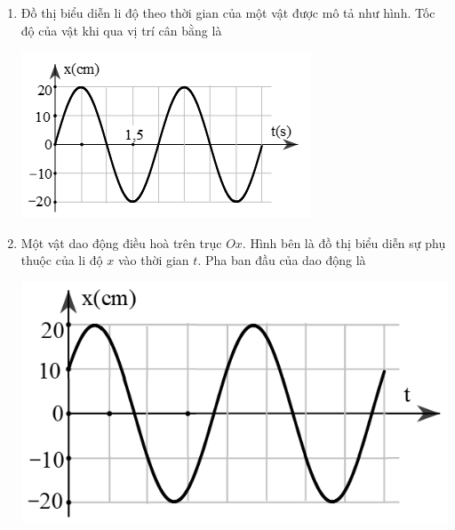 \begin{enumerate}[label=\bfseries Câu \arabic*:]
\item Đồ thị biểu diễn li độ theo thời gian của một vật được mô tả như hình. Tốc độ của vật khi qua vị trí cân bằng là
\begin{center}
	\includegraphics[width=0.4\linewidth]{../figs/D11-3-1}
\end{center}

\item Một vật dao động điều hoà trên trục $Ox$. Hình bên là đồ thị biểu diễn sự phụ thuộc của li độ $x$ vào thời gian $t$. Pha ban đầu của dao động là
\begin{center}
	\includegraphics[width=0.4\linewidth]{../figs/D11-3-4}
\end{center}


\end{enumerate}
